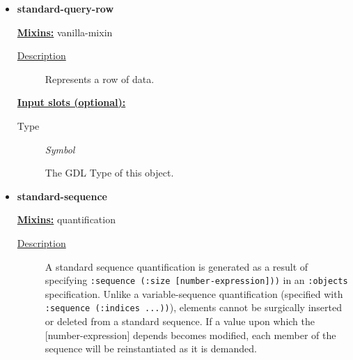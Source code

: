 \documentclass [11pt]{book}
\begin{document}
\begin{itemize}
\begin{description}
\end{description}









\item {}
\label{prim:standard-query-row}
\textbf{standard-query-row}


\textbf{
\underline{Mixins:}} vanilla-mixin





\begin{description}

\item [
\underline{Description}]


Represents a row of data.



\end{description}








\textbf{
\underline{Input slots (optional):}}

\begin{description}

\item [Type]
\emph{Symbol}

 The GDL Type of this object.




\end{description}







\item {}
\label{prim:standard-sequence}
\textbf{standard-sequence}


\textbf{
\underline{Mixins:}} quantification





\begin{description}

\item [
\underline{Description}]


A standard sequence quantification is generated as a result of specifying 
\texttt{:sequence (:size [number-expression]))} in an \texttt{:objects} specification. Unlike a variable-sequence 
quantification (specified with \texttt{:sequence (:indices ...))}), elements cannot be surgically inserted or 
deleted from a standard sequence. If a value upon which the [number-expression] depends becomes modified,
each member of the sequence will be reinstantiated as it is demanded.




\end{description}
\end{itemize}
\end{document}
